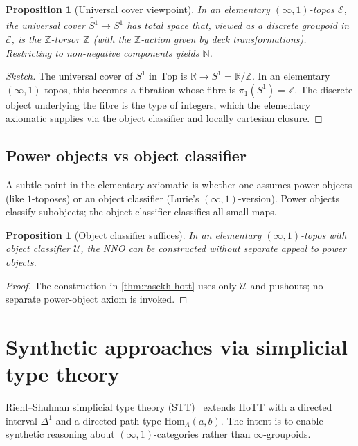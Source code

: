 \documentclass[12pt]{article}
\newtheorem{proposition}[theorem]{Proposition}
\theoremstyle{definition}
\theoremstyle{remark}
\newcommand{\N}{\mathbb{N}}
\newcommand{\Z}{\mathbb{Z}}
\newcommand{\R}{\mathbb{R}}
\newcommand{\Hom}{\mathrm{Hom}}
\newcommand{\U}{\mathcal{U}}
\newcommand{\Sone}{S^{1}}
\begin{document}
\begin{proposition}[Universal cover viewpoint]\label{prop:univ-cover}
In an elementary $(\infty,1)$-topos $\mathcal{E}$, the universal cover $\widetilde{\Sone}\to \Sone$ has total space that, viewed as a discrete groupoid in $\mathcal{E}$, is the $\Z$-torsor $\Z$ (with the $\Z$-action given by deck transformations). Restricting to non-negative components yields $\N$.
\end{proposition}

\begin{proof}[Sketch]
The universal cover of $\Sone$ in $\mathrm{Top}$ is $\R\to\Sone=\R/\Z$. In an elementary $(\infty,1)$-topos, this becomes a fibration whose fibre is $\pi_{1}(\Sone)=\Z$. The discrete object underlying the fibre is the type of integers, which the elementary axiomatic supplies via the object classifier and locally cartesian closure.
\end{proof}

\subsection{Power objects vs object classifier}

A subtle point in the elementary axiomatic is whether one assumes power objects (like $1$-toposes) or an object classifier (Lurie's $(\infty,1)$-version). Power objects classify subobjects; the object classifier classifies all small maps.

\begin{proposition}[Object classifier suffices]\label{prop:obj-class-suffices}
In an elementary $(\infty,1)$-topos with object classifier $\U$, the NNO can be constructed without separate appeal to power objects.
\end{proposition}

\begin{proof}
The construction in \cref{thm:rasekh-hott} uses only $\U$ and pushouts; no separate power-object axiom is invoked.
\end{proof}

\section{Synthetic approaches via simplicial type theory}\label{sec:stt}

Riehl--Shulman simplicial type theory (STT)~\cite{RiehlShulman2017} extends HoTT with a directed interval $\Delta^{1}$ and a directed path type $\Hom_{A}(a,b)$. The intent is to enable synthetic reasoning about $(\infty,1)$-categories rather than $\infty$-groupoids.
\end{document}
